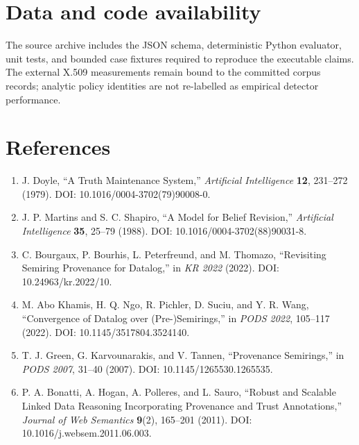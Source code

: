 \documentclass[11pt]{article}
\begin{document}
\hypertarget{data-and-code-availability}{%
\section{Data and code availability}\label{data-and-code-availability}}

The source archive includes the JSON schema, deterministic Python
evaluator, unit tests, and bounded case fixtures required to reproduce
the executable claims. The external X.509 measurements remain bound to
the committed corpus records; analytic policy identities are not
re-labelled as empirical detector performance.

\hypertarget{references}{%
\section{References}\label{references}}

\begin{enumerate}
\def\labelenumi{\arabic{enumi}.}
\item
  J. Doyle, ``A Truth Maintenance System,'' \emph{Artificial
  Intelligence} \textbf{12}, 231--272 (1979). DOI:
  10.1016/0004-3702(79)90008-0.
\item
  J. P. Martins and S. C. Shapiro, ``A Model for Belief Revision,''
  \emph{Artificial Intelligence} \textbf{35}, 25--79 (1988). DOI:
  10.1016/0004-3702(88)90031-8.
\item
  C. Bourgaux, P. Bourhis, L. Peterfreund, and M. Thomazo, ``Revisiting
  Semiring Provenance for Datalog,'' in \emph{KR 2022} (2022). DOI:
  10.24963/kr.2022/10.
\item
  M. Abo Khamis, H. Q. Ngo, R. Pichler, D. Suciu, and Y. R. Wang,
  ``Convergence of Datalog over (Pre-)Semirings,'' in \emph{PODS 2022},
  105--117 (2022). DOI: 10.1145/3517804.3524140.
\item
  T. J. Green, G. Karvounarakis, and V. Tannen, ``Provenance
  Semirings,'' in \emph{PODS 2007}, 31--40 (2007). DOI:
  10.1145/1265530.1265535.
\item
  P. A. Bonatti, A. Hogan, A. Polleres, and L. Sauro, ``Robust and
  Scalable Linked Data Reasoning Incorporating Provenance and Trust
  Annotations,'' \emph{Journal of Web Semantics} \textbf{9}(2), 165--201
  (2011). DOI: 10.1016/j.websem.2011.06.003.
\end{enumerate}
\end{document}
